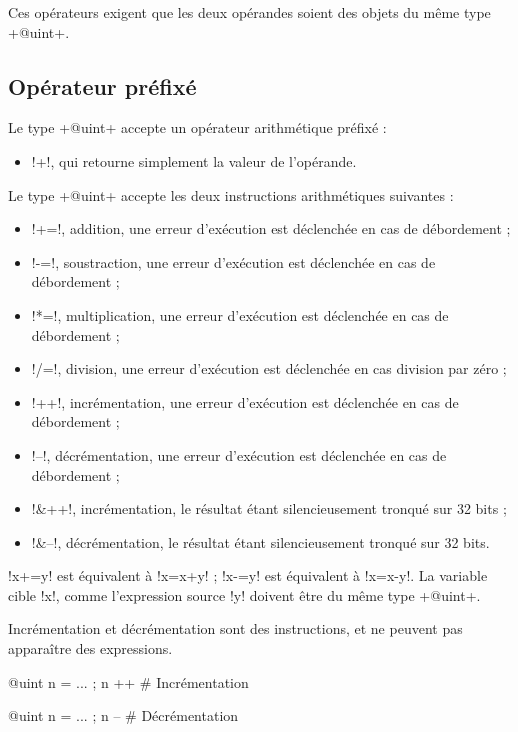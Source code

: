 {Ces opérateurs exigent que les deux opérandes soient des objets du même type \ggs+@uint+. 

\subsection{Opérateur préfixé}
Le type \ggs+@uint+ accepte un opérateur arithmétique préfixé :
\begin{itemize}
  \item \ggs!+!, qui retourne simplement la valeur de l'opérande.
\end{itemize}


Le type \ggs+@uint+ accepte les deux instructions arithmétiques suivantes :
\begin{itemize}
  \item \ggs!+=!, addition, une erreur d'exécution est déclenchée en cas de débordement ;
  \item \ggs!-=!, soustraction, une erreur d'exécution est déclenchée en cas de débordement ;
  \item \ggs!*=!, multiplication, une erreur d'exécution est déclenchée en cas de débordement ;
  \item \ggs!/=!, division, une erreur d'exécution est déclenchée en cas division par zéro ;
  \item \ggs!++!, incrémentation, une erreur d'exécution est déclenchée en cas de débordement ;
  \item \ggs!--!, décrémentation, une erreur d'exécution est déclenchée en cas de débordement ;
  \item \ggs!&++!, incrémentation, le résultat étant silencieusement tronqué sur 32 bits ;
  \item \ggs!&--!, décrémentation, le résultat étant silencieusement tronqué sur 32 bits.
\end{itemize}

\ggs!x+=y! est équivalent à \ggs!x=x+y! ; \ggs!x-=y! est équivalent à \ggs!x=x-y!.
La variable cible \ggs!x!, comme l'expression source \ggs!y! doivent être du même type \ggs+@uint+. 

Incrémentation et décrémentation sont des instructions, et ne peuvent pas apparaître des expressions.
\begin{galgas}
@uint n = ... ; n ++ # Incrémentation
\end{galgas}

\begin{galgas}
@uint n = ... ; n -- # Décrémentation
\end{galgas}




}

